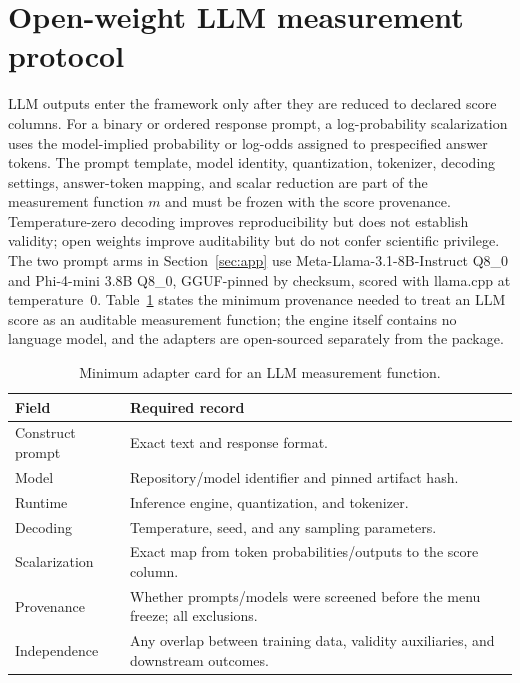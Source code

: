 \documentclass[10pt,letterpaper]{article}
\begin{document}
\section{Open-weight LLM measurement protocol}
\label{app:llm}

LLM outputs enter the framework only after they are reduced to declared score columns.
For a binary or ordered response prompt, a log-probability scalarization uses the model-implied probability or log-odds assigned to prespecified answer tokens.
The prompt template, model identity, quantization, tokenizer, decoding settings, answer-token mapping, and scalar reduction are part of the measurement function $m$ and must be frozen with the score provenance.
Temperature-zero decoding improves reproducibility but does not establish validity; open weights improve auditability but do not confer scientific privilege.
The two prompt arms in Section~\ref{sec:app} use Meta-Llama-3.1-8B-Instruct Q8\_0 and Phi-4-mini 3.8B Q8\_0, GGUF-pinned by checksum, scored with llama.cpp at temperature~0.
Table~\ref{tab:adapter} states the minimum provenance needed to treat an LLM score as an auditable measurement function; the engine itself contains no language model, and the adapters are open-sourced separately from the package.

\begin{table}[ht]
\centering
\small
\caption{Minimum adapter card for an LLM measurement function.}
\label{tab:adapter}
\begin{tabularx}{\textwidth}{@{}>{\raggedright\arraybackslash}p{3.0cm} X@{}}
\toprule
\textbf{Field} & \textbf{Required record} \\
\midrule
Construct prompt & Exact text and response format. \\
Model & Repository/model identifier and pinned artifact hash. \\
Runtime & Inference engine, quantization, and tokenizer. \\
Decoding & Temperature, seed, and any sampling parameters. \\
Scalarization & Exact map from token probabilities/outputs to the score column. \\
Provenance & Whether prompts/models were screened before the menu freeze; all exclusions. \\
Independence & Any overlap between training data, validity auxiliaries, and downstream outcomes. \\
\bottomrule
\end{tabularx}
\end{table}
\end{document}
